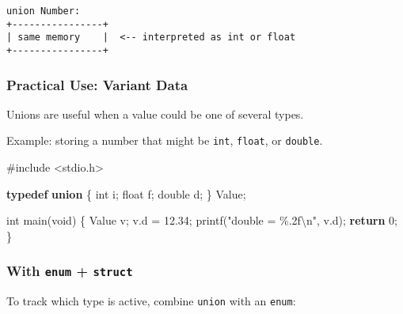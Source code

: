 \documentclass[
  letterpaper,
  DIV=11,
  numbers=noendperiod]{scrreprt}
\newenvironment{Shaded}{\begin{snugshade}}{\end{snugshade}}
\newcommand{\ControlFlowTok}[1]{\textcolor[rgb]{0.00,0.23,0.31}{\textbf{#1}}}
\newcommand{\DataTypeTok}[1]{\textcolor[rgb]{0.68,0.00,0.00}{#1}}
\newcommand{\DecValTok}[1]{\textcolor[rgb]{0.68,0.00,0.00}{#1}}
\newcommand{\FloatTok}[1]{\textcolor[rgb]{0.68,0.00,0.00}{#1}}
\newcommand{\ImportTok}[1]{\textcolor[rgb]{0.00,0.46,0.62}{#1}}
\newcommand{\KeywordTok}[1]{\textcolor[rgb]{0.00,0.23,0.31}{\textbf{#1}}}
\newcommand{\NormalTok}[1]{\textcolor[rgb]{0.00,0.23,0.31}{#1}}
\newcommand{\OperatorTok}[1]{\textcolor[rgb]{0.37,0.37,0.37}{#1}}
\newcommand{\PreprocessorTok}[1]{\textcolor[rgb]{0.68,0.00,0.00}{#1}}
\newcommand{\SpecialCharTok}[1]{\textcolor[rgb]{0.37,0.37,0.37}{#1}}
\newcommand{\StringTok}[1]{\textcolor[rgb]{0.13,0.47,0.30}{#1}}
\begin{document}
\begin{verbatim}
union Number:
+----------------+
| same memory    |  <-- interpreted as int or float
+----------------+
\end{verbatim}

\subsubsection{Practical Use: Variant
Data}\label{practical-use-variant-data}

Unions are useful when a value could be one of several types.

Example: storing a number that might be \texttt{int}, \texttt{float}, or
\texttt{double}.

\begin{Shaded}
\begin{Highlighting}[]
\PreprocessorTok{\#include }\ImportTok{\textless{}stdio.h\textgreater{}}

\KeywordTok{typedef} \KeywordTok{union} \OperatorTok{\{}
    \DataTypeTok{int}\NormalTok{ i}\OperatorTok{;}
    \DataTypeTok{float}\NormalTok{ f}\OperatorTok{;}
    \DataTypeTok{double}\NormalTok{ d}\OperatorTok{;}
\OperatorTok{\}}\NormalTok{ Value}\OperatorTok{;}

\DataTypeTok{int}\NormalTok{ main}\OperatorTok{(}\DataTypeTok{void}\OperatorTok{)} \OperatorTok{\{}
\NormalTok{    Value v}\OperatorTok{;}
\NormalTok{    v}\OperatorTok{.}\NormalTok{d }\OperatorTok{=} \FloatTok{12.34}\OperatorTok{;}
\NormalTok{    printf}\OperatorTok{(}\StringTok{"double = }\SpecialCharTok{\%.2f\textbackslash{}n}\StringTok{"}\OperatorTok{,}\NormalTok{ v}\OperatorTok{.}\NormalTok{d}\OperatorTok{);}
    \ControlFlowTok{return} \DecValTok{0}\OperatorTok{;}
\OperatorTok{\}}
\end{Highlighting}
\end{Shaded}

\subsubsection{\texorpdfstring{With \texttt{enum} +
\texttt{struct}}{With enum + struct}}\label{with-enum-struct}

To track which type is active, combine \texttt{union} with an
\texttt{enum}:
\end{document}
